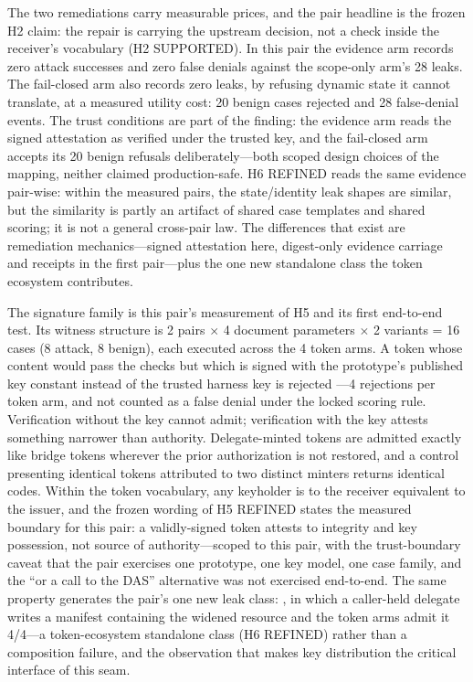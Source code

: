 \documentclass[sigconf,anonymous,nonacm]{acmart}
\newcommand{\code}[1]{\texttt{\detokenize{#1}}}
\newcommand{\status}[1]{\textsc{#1}}
\begin{document}
The two remediations carry measurable prices, and the pair headline is the frozen H2 claim: the repair is carrying the upstream decision, not a check inside the receiver's vocabulary (H2 \status{SUPPORTED}). In this pair the evidence arm records zero attack successes and zero false denials against the scope-only arm's 28 leaks. The fail-closed arm also records zero leaks, by refusing dynamic state it cannot translate, at a measured utility cost: 20 benign cases rejected and 28 false-denial events. The trust conditions are part of the finding: the evidence arm reads the signed attestation as verified under the trusted key, and the fail-closed arm accepts its 20 benign refusals deliberately---both scoped design choices of the mapping, neither claimed production-safe. H6 \status{REFINED} reads the same evidence pair-wise: within the measured pairs, the state/identity leak shapes are similar, but the similarity is partly an artifact of shared case templates and shared scoring; it is not a general cross-pair law. The differences that exist are remediation mechanics---signed attestation here, digest-only evidence carriage and receipts in the first pair---plus the one new standalone class the token ecosystem contributes.

The signature family is this pair's measurement of H5 and its first end-to-end test. Its witness structure is 2 pairs $\times$ 4 document parameters $\times$ 2 variants = 16 cases (8 attack, 8 benign), each executed across the 4 token arms. A token whose content would pass the checks but which is signed with the prototype's published key constant instead of the trusted harness key is rejected \code{SIGNATURE_INVALID}---4 rejections per token arm, and not counted as a false denial under the locked scoring rule. Verification without the key cannot admit; verification with the key attests something narrower than authority. Delegate-minted tokens are admitted exactly like bridge tokens wherever the prior authorization is not restored, and a control presenting identical tokens attributed to two distinct minters returns identical codes. Within the token vocabulary, any keyholder is to the receiver equivalent to the issuer, and the frozen wording of H5 \status{REFINED} states the measured boundary for this pair: a validly-signed token attests to integrity and key possession, not source of authority---scoped to this pair, with the trust-boundary caveat that the pair exercises one prototype, one key model, one case family, and the ``or a call to the DAS'' alternative was not exercised end-to-end. The same property generates the pair's one new leak class: \code{keyholder_widen}, in which a caller-held delegate writes a manifest containing the widened resource and the token arms admit it 4/4---a token-ecosystem standalone class (H6 \status{REFINED}) rather than a composition failure, and the observation that makes key distribution the critical interface of this seam.
\end{document}
